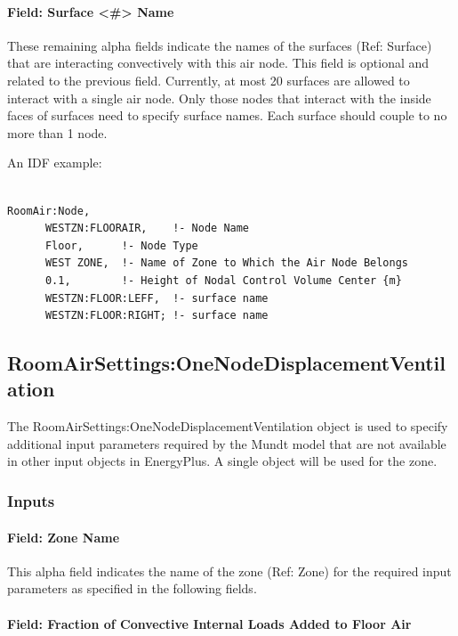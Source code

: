 \paragraph{Field: Surface \textless{}\#\textgreater{} Name}\label{field-surface-name-004}

These remaining alpha fields indicate the names of the surfaces (Ref: Surface) that are interacting convectively with this air node. This field is optional and related to the previous field. Currently, at most 20 surfaces are allowed to interact with a single air node. Only those nodes that interact with the inside faces of surfaces need to specify surface names. Each surface should couple to no more than 1 node.

An IDF example:

\begin{lstlisting}

RoomAir:Node,
      WESTZN:FLOORAIR,    !- Node Name
      Floor,      !- Node Type
      WEST ZONE,  !- Name of Zone to Which the Air Node Belongs
      0.1,        !- Height of Nodal Control Volume Center {m}
      WESTZN:FLOOR:LEFF,  !- surface name
      WESTZN:FLOOR:RIGHT; !- surface name
\end{lstlisting}

\subsection{RoomAirSettings:OneNodeDisplacementVentilation}\label{roomairsettingsonenodedisplacementventilation}

The RoomAirSettings:OneNodeDisplacementVentilation object is used to specify additional input parameters required by the Mundt model that are not available in other input objects in EnergyPlus. A single object will be used for the zone.

\subsubsection{Inputs}\label{inputs-7-022}

\paragraph{Field: Zone Name}\label{field-zone-name-3-005}

This alpha field indicates the name of the zone (Ref: Zone) for the required input parameters as specified in the following fields.

\paragraph{Field: Fraction of Convective Internal Loads Added to Floor Air}\label{field-fraction-of-convective-internal-loads-added-to-floor-air}

